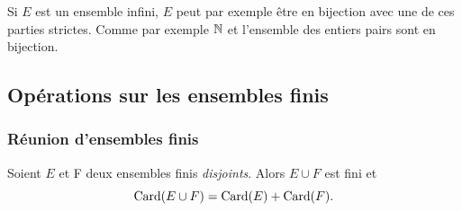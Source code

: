 Si \(E\) est un ensemble infini, \(E\) peut par exemple être en bijection avec une de ces parties strictes. Comme par exemple \(\mathbb{N}\) et l'ensemble des entiers pairs sont en bijection.

\subsection{Opérations sur les ensembles finis}

\subsubsection{Réunion d'ensembles finis}

\begin{prop}\label{prop:reunionfindis}
  Soient \(E\) et F deux ensembles finis \emph{disjoints}. Alors \(E\cup F\) est fini et 
  \begin{equation}
    \operatorname{Card}(E\cup F)=\operatorname{Card}(E)+\operatorname{Card}(F).
  \end{equation}
\end{prop}

